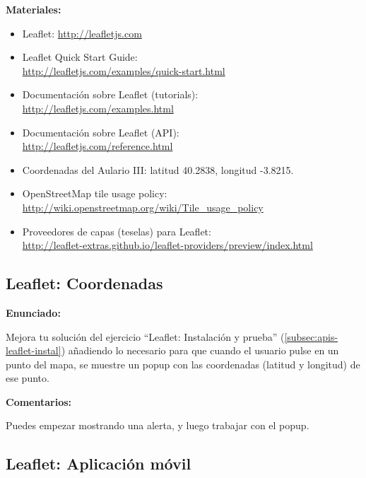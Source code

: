 \textbf{Materiales:}

\begin{itemize}
\item Leaflet: \url{http://leafletjs.com}
\item Leaflet Quick Start Guide: \\
  \url{http://leafletjs.com/examples/quick-start.html}
\item Documentación sobre Leaflet (tutorials): \\
  \url{http://leafletjs.com/examples.html}
\item Documentación sobre Leaflet (API): \\
  \url{http://leafletjs.com/reference.html}
\item Coordenadas del Aulario III: latitud 40.2838, longitud -3.8215.
\item OpenStreetMap tile usage policy: \\
  \url{http://wiki.openstreetmap.org/wiki/Tile_usage_policy}
\item Proveedores de capas (teselas) para Leaflet: \\
  \url{http://leaflet-extras.github.io/leaflet-providers/preview/index.html}
\end{itemize}

\subsection{Leaflet: Coordenadas}
\label{subsec:apis-leaflet-coordenadas}

\textbf{Enunciado:}

Mejora tu solución del ejercicio ``Leaflet: Instalación y prueba'' (\ref{subsec:apis-leaflet-instal}) añadiendo lo necesario para que cuando el usuario pulse en un punto del mapa, se muestre un popup con las coordenadas (latitud y longitud) de ese punto.

\textbf{Comentarios:}

Puedes empezar mostrando una alerta, y luego trabajar con el popup.

\subsection{Leaflet: Aplicación móvil}
\label{subsec:apis-leaflet-movil}

